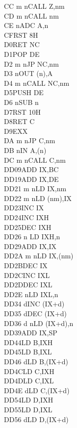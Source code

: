 \begin{multicols}{3}
{\begin{tabbing}
	CC m n\>CALL Z,nm\\
	CD m n\>CALL nm\\
	CE n\>ADC A,n\\
	CF\>RST 8H\\
	D0\>RET NC\\
	D1\>POP DE\\
	D2 m n\>JP NC,nm\\
	D3 n\>OUT (n),A\\
	D4 m n\>CALL NC,nm\\
	D5\>PUSH DE\\
	D6 n\>SUB n\\
	D7\>RST 10H\\
	D8\>RET C\\
	D9\>EXX\\
	DA m n\>JP C,nm\\
	DB n\>IN A,(n)\\
	DC m n\>CALL C,nm\\
	DD09\>ADD IX,BC\\
	DD19\>ADD IX,DE\\
	DD21 m n\>LD IX,nm\\
	DD22 m n\>LD (nm),IX\\
	DD23\>INC IX\\
	DD24\>INC IXH\UNDOC\\
	DD25\>DEC IXH\UNDOC\\
	DD26 n \>LD IXH,n\UNDOC\\
	DD29\>ADD IX,IX\\
	DD2A m n\>LD IX,(nm)\\
	DD2B\>DEC IX\\
	DD2C\>INC IXL\UNDOC\\
	DD2D\>DEC IXL\UNDOC\\
	DD2E n\>LD IXL,n\UNDOC\\
	DD34 d\>INC (IX+d)\\
	DD35 d\>DEC (IX+d)\\
	DD36 d n\>LD (IX+d),n\\
	DD39\>ADD IX,SP\\
	DD44\>LD B,IXH\UNDOC\\
	DD45\>LD B,IXL\UNDOC\\
	DD46 d\>LD B,(IX+d)\\
	DD4C\>LD C,IXH\UNDOC\\
	DD4D\>LD C,IXL\UNDOC\\
	DD4E d\>LD C,(IX+d)\\
	DD54\>LD D,IXH\UNDOC\\
	DD55\>LD D,IXL\UNDOC\\
	DD56 d\>LD D,(IX+d)\\

\end{tabbing}}
\end{multicols}
